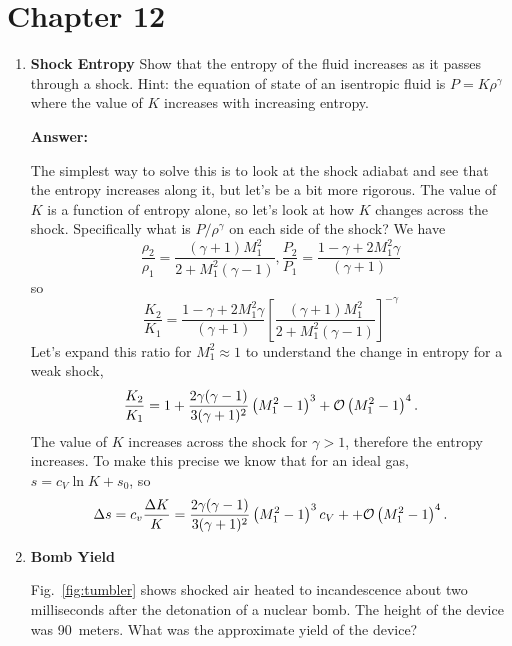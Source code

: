\documentclass{article}
\begin{document}
\fi

\section{Chapter 12}
\begin{enumerate}
\item{\bf Shock Entropy}
  Show that the entropy of the fluid increases as it passes
  through a shock. Hint: the equation of state of an isentropic fluid
  is $P = K\rho^\gamma$ where the value of $K$ increases with
  increasing entropy.

{\bf Answer:}

The simplest way to solve this is to look at the shock adiabat and see
that the entropy increases along it, but let's be a bit more
rigorous.  The value of $K$ is a function of entropy alone, so let's
look at how $K$ changes across the shock.   Specifically what is
$P/\rho^\gamma$ on each side of the shock?  We have
\begin{equation}
\frac{\rho_2}{\rho_1} = \frac{(\gamma+1)
  M_1^2}{2 + M_1^2 (\gamma-1)},
\frac{P_2}{P_1} = \frac{1-\gamma + 2 M_1^2 \gamma }{(\gamma+1)}
 \end{equation}
so 
\begin{equation}
\frac{K_2}{K_1} = \frac{1-\gamma + 2 M_1^2 \gamma }{(\gamma+1)} 
\left [ \frac{(\gamma+1)
  M_1^2}{2 + M_1^2 (\gamma-1)} \right ]^{-\gamma}
\end{equation}
Let's expand this ratio for $M_1^2 \approx 1$ to understand the change
in entropy for a weak shock,
\begin{equation}
\frac{K_2}{K_1} = 1 + \frac{2\gamma(\gamma-1)}{3(\gamma+1)^2} \left (M_1^2 - 1\right
)^3 + {\cal O} \left (M_1^2 - 1\right)^4.
\end{equation}
The value of $K$ increases across the shock for $\gamma>1$, therefore
the entropy increases.  To make this precise we know that for an ideal
gas, $s = c_V \ln K + s_0$, so 
\begin{equation}
\Delta s = c_v \frac{\Delta K}{K} =
\frac{2\gamma(\gamma-1)}{3(\gamma+1)^2} \left (M_1^2 - 1\right )^3 c_V
+ + {\cal O} \left (M_1^2 - 1\right)^4.
\end{equation}

\item{\bf Bomb Yield}

  Fig.~\ref{fig:tumbler} shows shocked air heated to incandescence
  about two milliseconds after the detonation of a nuclear
  bomb.  The height of the device was 90~meters.  What
  was the approximate yield of the device?


\end{enumerate}
\end{document}

